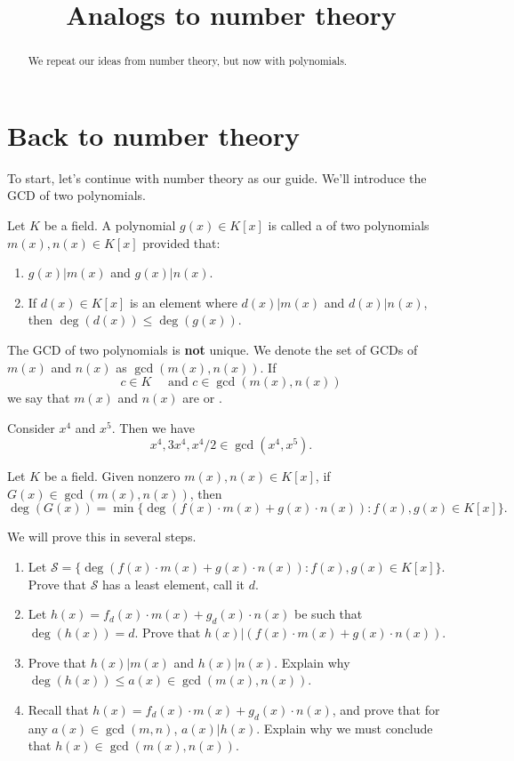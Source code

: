 \documentclass{ximera}
\title{Analogs to number theory}
\begin{document}
\begin{abstract}
  We repeat our ideas from number theory, but now with polynomials.
\end{abstract}
\maketitle


\section{Back to number theory}


To start, let's continue with number theory as our guide. We'll
introduce the GCD of two polynomials.

\begin{definition}
  Let $K$ be a field. A polynomial $g(x)\in K[x]$ is called a
   of two polynomials $m(x),n(x)\in K[x]$
  provided that:
  \begin{enumerate}
  \item $g(x) | m(x)$ and $g(x) | n(x)$.
  \item If $d(x)\in K[x]$ is an element where $d(x)| m(x)$ and $d(x) | n(x)$, then $\deg(d(x))\le \deg(g(x))$.
  \end{enumerate}
  The GCD of two polynomials is \textbf{not} unique.  We denote the set of GCDs
  of $m(x)$ and $n(x)$ as $\gcd(m(x),n(x))$. If
  \[
  c\in K\quad\text{ and }c\in \gcd(m(x),n(x))
  \]
  we say that $m(x)$ and $n(x)$ are  or .
\end{definition}


\begin{example}
  Consider $x^4$ and $x^5$. Then we have
  \[
  x^4, 3x^4, x^4/2 \in \gcd(x^4,x^5).
  \]
\end{example}

\begin{theorem}\label{T:ELP1}
  Let $K$ be a field. Given nonzero $m(x),n(x)\in K[x]$, if $G(x)\in
  \gcd(m(x),n(x))$, then
  \[
  \deg(G(x)) = \min\{\deg(f(x)\cdot m(x) +g(x)\cdot n(x)): f(x),g(x)\in K[x]\}.
  \]
  \begin{sketch} We will prove this in several steps.
  \begin{enumerate}
  \item Let $\mathcal S = \{\deg(f(x)\cdot m(x) +g(x)\cdot n(x)):
    f(x),g(x)\in K[x]\}$. Prove that $\mathcal S$ has a least element,
    call it $d$.
  \item Let $h(x) = f_d(x)\cdot m(x) +g_d(x)\cdot n(x)$ be such that
    $\deg(h(x)) = d$. Prove that $h(x)| (f(x)\cdot m(x) +g(x)\cdot n(x))$.
  \item Prove that $h(x)| m(x)$ and $h(x)| n(x)$. Explain why $\deg(h(x)) \le a(x)\in\gcd(m(x),n(x))$.
  \item Recall that $h(x) = f_d(x)\cdot m(x) +g_d(x)\cdot n(x)$, and prove that
    for any $a(x)\in\gcd(m,n)$, $a(x) | h(x)$. Explain why we must
    conclude that $h(x)\in\gcd(m(x),n(x))$.
  \end{enumerate}
  \end{sketch}
\end{theorem}
\end{document}
